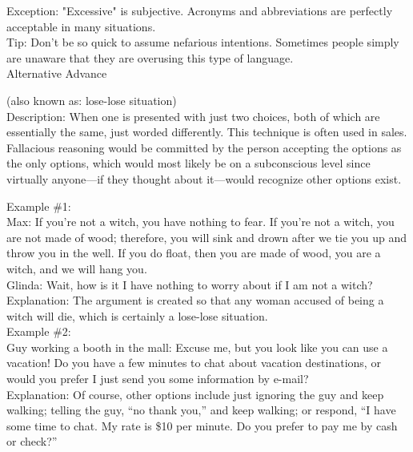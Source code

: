 \documentclass[a4paper,12pt,single,pdftex]{scrbook}
\begin{document}
    
      Exception: "Excessive" is subjective. Acronyms and abbreviations are perfectly acceptable in many situations.
    \\

    
      Tip: Don't be so quick to assume nefarious intentions. Sometimes people simply are unaware that they are overusing this type of language.
    \\

  

Alternative Advance
    
      (also known as: lose-lose situation)
    \\

  
    Description: When one is presented with just two choices, both of which are essentially the same, just worded differently.  This technique is often used in sales.  Fallacious reasoning would be committed by the person accepting the options as the only options, which would most likely be on a subconscious level since virtually anyone—if they thought about it—would recognize other options exist.

    
      Example \#1:
    \\

    
      Max: If you’re not a witch, you have nothing to fear.  If you’re not a witch, you are not made of wood; therefore, you will sink and drown after we tie you up and throw you in the well.  If you do float, then you are made of wood, you are a witch, and we will hang you.
    \\

    
      Glinda: Wait, how is it I have nothing to worry about if I am not a witch?
    \\

    
      Explanation: The argument is created so that any woman accused of being a witch will die, which is certainly a lose-lose situation.
    \\

    
      Example \#2:
    \\

    
      Guy working a booth in the mall: Excuse me, but you look like you can use a vacation!  Do you have a few minutes to chat about vacation destinations, or would you prefer I just send you some information by e-mail?
    \\

    
      Explanation: Of course, other options include just ignoring the guy and keep walking; telling the guy, “no thank you,” and keep walking; or respond, “I have some time to chat. My rate is \$10 per minute. Do you prefer to pay me by cash or check?”
    \\
\end{document}
